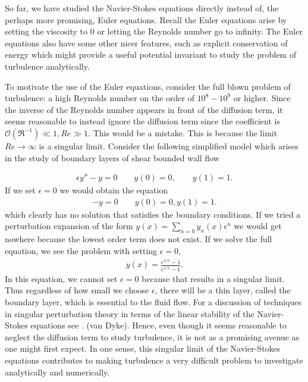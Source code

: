 So far, we have studied the Navier-Stokes equations directly instead of, the perhaps more promising, Euler equations. Recall the Euler equations arise by setting the viscosity to $0$ or letting the Reynolds number go to infinity. The Euler equations also have some other nicer features, such as explicit conservation of energy which might provide a useful potential invariant to study the problem of turbulence analytically. 

To motivate the use of the Euler equations, consider the full blown problem of turbulence: a high Reynolds number on the order of $10^{8}-10^{9}$ or higher. Since the inverse of the Reynolds number appears in front of the diffusion term, it seems reasonable to instead ignore the diffusion term since the coefficient is $\mathcal{O}(\Re^{-1}) \ll 1, Re\gg 1$. This would be a mistake. This is because the limit $Re\rightarrow\infty$ is a singular limit. Consider the following simplified model which arises in the study of boundary layers of shear bounded wall flow\cite{benderorszag,acheson_fluid,kundu}

\begin{align}
\epsilon y'' - y =0 \qquad y(0)=0,\qquad y(1)=1.
\end{align}
If we set $\epsilon=0$ we would obtain the equation 
\begin{align}
- y =0 \qquad y(0)=0,y(1)=1.
\end{align}
which clearly has no solution that satisfies the boundary conditions. If we tried a perturbation expansion of the form $y(x) =\sum_{n=0}y_{n}(x)\epsilon^{n}$ we would get nowhere because the lowest order term does not exist. If we solve the full equation, we see the problem with setting $\epsilon=0$,
\begin{align}
y(x) = \frac{e^{x/\epsilon}-1}{e^{1/\epsilon}-1}.
\end{align}
In this equation, we cannot set $\epsilon=0$ because that results in a singular limit. Thus regardless of how small we choose $\epsilon$, there will be a thin layer, called the boundary layer, which is essential to the fluid flow. For a discussion of techniques in singular perturbation theory in terms of the linear stability of the Navier-Stokes equations see \cite{drazinreid}. (van Dyke). Hence, even though it seems reasonable to neglect the diffusion term to study turbulence, it is not as a promising avenue as one might first expect. In one sense, this singular limit of the Navier-Stokes equations contributes to making turbulence a very difficult problem to investigate analytically and numerically. 

